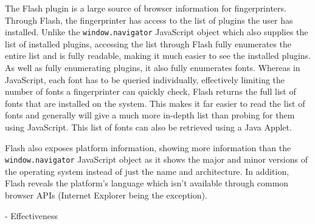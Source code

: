 The Flash plugin is a large source of browser information for fingerprinters.
Through Flash, the fingerprinter has access to the list of plugins the user has installed.
Unlike the \texttt{window.navigator} JavaScript object which also supplies the list of installed plugins, accessing the list through Flash fully enumerates the entire list and is fully readable, making it much easier to see the installed plugins.
As well as fully enumerating plugins, it also fully enumerates fonts.
Whereas in JavaScript, each font has to be queried individually, effectively limiting the number of fonts a fingerprinter can quickly check, Flash returns the full list of fonts that are installed on the system.
This makes it far easier to read the list of fonts and generally will give a much more in-depth list than probing for them using JavaScript.
This list of fonts can also be retrieved using a Java Applet.

Flash also exposes platform information, showing more information than the \texttt{window.navigator} JavaScript object as it shows the major and minor versions of the operating system instead of just the name and architecture.
In addition, Flash reveals the platform's language which isn't available through common browser APIs (Internet Explorer being the exception).

- Effectiveness
